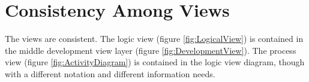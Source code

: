 \chapter{Consistency Among Views}

The views are consistent. The logic view (figure \ref{fig:LogicalView}) is contained in the middle development view layer (figure \ref{fig:DevelopmentView}). The process view (figure \ref{fig:ActivityDiagram}) is contained in the logic view diagram, though with a different notation and different information needs.
